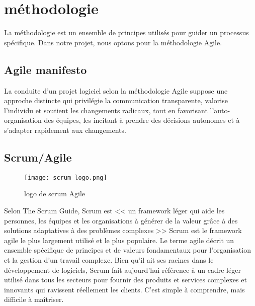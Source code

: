 \section{méthodologie}
La méthodologie est un ensemble de principes utilisés pour guider un processus spécifique. Dans notre projet, nous optons pour la méthodologie Agile.
\subsection{Agile manifesto}
La conduite d'un projet logiciel selon la méthodologie Agile suppose une approche distincte qui privilégie la communication transparente, valorise l'individu et soutient les changements radicaux, tout en favorisant l'auto-organisation des équipes, les incitant à prendre des décisions autonomes et à s'adapter rapidement aux changements.\

\subsection{Scrum/Agile}
\begin{wrapfigure}{r}{0.25\textwidth} 
    \centering
    \texttt{[image: scrum logo.png]}
    \caption{logo de scrum Agile}
\end{wrapfigure}
Selon The Scrum Guide\textsuperscript{\texttrademark}, Scrum est << un framework léger qui aide les personnes, les équipes et les organisations à générer de la valeur grâce à des solutions adaptatives à des problèmes complexes >> Scrum est le framework agile le plus largement utilisé et le plus populaire. Le terme agile décrit un ensemble spécifique de principes et de valeurs fondamentaux pour l'organisation et la gestion d'un travail complexe.
Bien qu'il ait ses racines dans le développement de logiciels, Scrum fait aujourd'hui référence à un cadre léger utilisé dans tous les secteurs pour fournir des produits et services complexes et innovants qui ravissent réellement les clients. C'est simple à comprendre, mais difficile à maîtriser.
